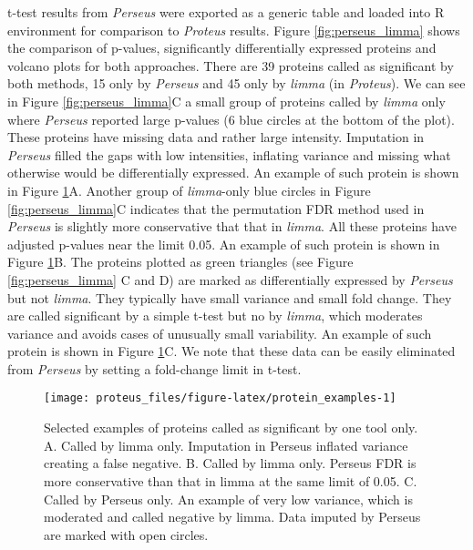 \documentclass[]{article}
\begin{document}
t-test results from \emph{Perseus} were exported as a generic table and
loaded into R environment for comparison to \emph{Proteus} results.
Figure \ref{fig:perseus_limma} shows the comparison of p-values,
significantly differentially expressed proteins and volcano plots for
both approaches. There are 39 proteins called as significant by both
methods, 15 only by \emph{Perseus} and 45 only by \emph{limma} (in
\emph{Proteus}). We can see in Figure \ref{fig:perseus_limma}C a small
group of proteins called by \emph{limma} only where \emph{Perseus}
reported large p-values (6 blue circles at the bottom of the plot).
These proteins have missing data and rather large intensity. Imputation
in \emph{Perseus} filled the gaps with low intensities, inflating
variance and missing what otherwise would be differentially expressed.
An example of such protein is shown in Figure
\ref{fig:protein_examples}A. Another group of \emph{limma}-only blue
circles in Figure \ref{fig:perseus_limma}C indicates that the
permutation FDR method used in \emph{Perseus} is slightly more
conservative that that in \emph{limma}. All these proteins have adjusted
p-values near the limit 0.05. An example of such protein is shown in
Figure \ref{fig:protein_examples}B. The proteins plotted as green
triangles (see Figure \ref{fig:perseus_limma} C and D) are marked as
differentially expressed by \emph{Perseus} but not \emph{limma}. They
typically have small variance and small fold change. They are called
significant by a simple t-test but no by \emph{limma}, which moderates
variance and avoids cases of unusually small variability. An example of
such protein is shown in Figure \ref{fig:protein_examples}C. We note
that these data can be easily eliminated from \emph{Perseus} by setting
a fold-change limit in t-test.

\begin{figure}[H]

{\centering \texttt{[image: proteus\_files/figure-latex/protein\_examples-1]} 

}

\caption{\label{fig:protein_examples}Selected examples of proteins called as significant by one tool only. A. Called by limma only. Imputation in Perseus inflated variance creating a false negative. B. Called by limma only. Perseus FDR is more conservative than that in limma at the same limit of 0.05. C. Called by Perseus only. An example of very low variance, which is moderated and called negative by limma. Data imputed by Perseus are marked with open circles.}\label{fig:protein_examples}
\end{figure}
\end{document}
